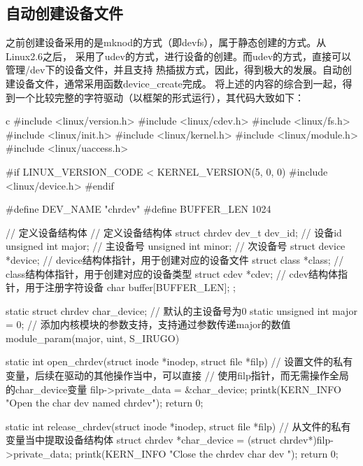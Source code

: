 \subsection{自动创建设备文件}
之前创建设备采用的是mknod的方式（即devfs），属于静态创建的方式。从Linux2.6之后，
采用了udev的方式，进行设备的创建。而udev的方式，直接可以管理/dev下的设备文件，并且支持
热插拔方式，因此，得到极大的发展。自动创建设备文件，通常采用函数device\_create完成。
将上述的内容的综合到一起，得到一个比较完整的字符驱动（以框架的形式运行），其代码大致如下：
\begin{code-block}{c}
#include <linux/version.h>
#include <linux/cdev.h>
#include <linux/fs.h>
#include <linux/init.h>
#include <linux/kernel.h>
#include <linux/module.h>
#include <linux/uaccess.h>

#if LINUX_VERSION_CODE < KERNEL_VERSION(5, 0, 0)
#include <linux/device.h>
#endif

#define DEV_NAME "chrdev"
#define BUFFER_LEN 1024

// 定义设备结构体
// 定义设备结构体
struct chrdev {
        dev_t          dev_id;  // 设备id
        unsigned int   major;   // 主设备号
        unsigned int   minor;   // 次设备号
        struct device  *device; // device结构体指针，用于创建对应的设备文件
        struct class   *class;  // class结构体指针，用于创建对应的设备类型
        struct cdev    *cdev;   // cdev结构体指针，用于注册字符设备
        char           buffer[BUFFER_LEN];
};

static struct chrdev char_device;
// 默认的主设备号为0
static unsigned int major = 0;
// 添加内核模块的参数支持，支持通过参数传递major的数值
module_param(major, uint, S_IRUGO)

static int open_chrdev(struct inode *inodep, struct file *filp)
{
        // 设置文件的私有变量，后续在驱动的其他操作当中，可以直接
        // 使用filp指针，而无需操作全局的char_device变量
        filp->private_data = &char_device;
        printk(KERN_INFO "Open the char dev named chrdev\n");
        return 0;
}

static int release_chrdev(struct inode *inodep, struct file *filp)
{
        // 从文件的私有变量当中提取设备结构体
        struct chrdev *char_device = (struct chrdev*)filp->private_data;
        printk(KERN_INFO "Close the chrdev char dev \n");
        return 0;
}


\end{code-block}
